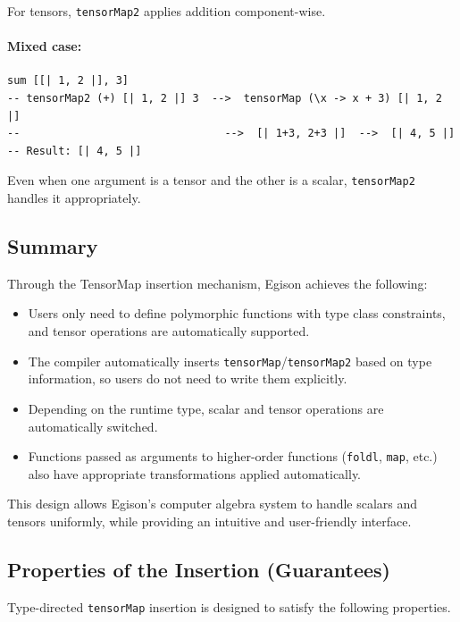 For tensors, \lstinline{tensorMap2} applies addition component-wise.

\paragraph{Mixed case:}
\begin{lstlisting}[language=egison,numbers=none]
sum [[| 1, 2 |], 3]
-- tensorMap2 (+) [| 1, 2 |] 3  -->  tensorMap (\x -> x + 3) [| 1, 2 |]
--                                -->  [| 1+3, 2+3 |]  -->  [| 4, 5 |]
-- Result: [| 4, 5 |]
\end{lstlisting}

Even when one argument is a tensor and the other is a scalar, \lstinline{tensorMap2} handles it appropriately.

\subsection{Summary}

Through the TensorMap insertion mechanism, Egison achieves the following:

\begin{itemize}
\item Users only need to define polymorphic functions with type class constraints, and tensor operations are automatically supported.
\item The compiler automatically inserts \lstinline{tensorMap}/\lstinline{tensorMap2} based on type information, so users do not need to write them explicitly.
\item Depending on the runtime type, scalar and tensor operations are automatically switched.
\item Functions passed as arguments to higher-order functions (\lstinline{foldl}, \lstinline{map}, etc.) also have appropriate transformations applied automatically.
\end{itemize}

This design allows Egison's computer algebra system to handle scalars and tensors uniformly, while providing an intuitive and user-friendly interface.

\subsection{Properties of the Insertion (Guarantees)}\label{tensor-guarantees}

Type-directed \lstinline{tensorMap} insertion is designed to satisfy the following properties.

